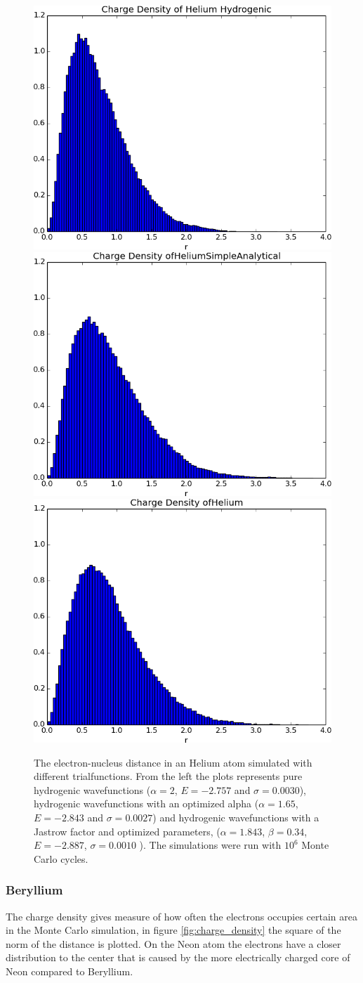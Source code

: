 		\begin{figure}
				\centering 
				\includegraphics[width=0.32\linewidth]{../figures/used/ChargeDensityHeliumHydrogenic}
				\includegraphics[width=0.32\linewidth]{../figures/used/ChargeDensityHeliumSimpleAnalytical}
				\includegraphics[width=0.32\linewidth]{../figures/used/ChargeDensityHelium_trimmed}
				\protect\caption{The electron-nucleus distance in an Helium atom simulated with different trialfunctions. From the left the plots represents pure hydrogenic wavefunctions ($\alpha = 2$, $E = -2.757$ and $\sigma = 0.0030$), hydrogenic wavefunctions with an optimized alpha ($\alpha = 1.65$, $E = -2.843$ and $\sigma = 0.0027$) and hydrogenic wavefunctions with a Jastrow factor and optimized parameters, ($\alpha = 1.843$, $\beta = 0.34$, $E = -2.887$, $\sigma = 0.0010$ ). The simulations were run with \(10^6\) Monte Carlo cycles.}
				\label{fig:HeliumChargeDensity}
		\end{figure}


	\subsubsection{Beryllium}
		The charge density gives measure of how often the electrons occupies certain area in the Monte Carlo simulation, in figure \ref{fig:charge_density} the square of the norm of the distance is plotted.
		On the Neon atom the electrons have a closer distribution to the center that is caused by the more electrically charged core of Neon compared to Beryllium.

